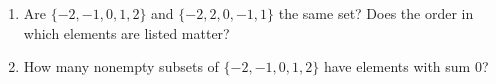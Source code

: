 \begin{enumerate}
\item[(a)] Are $\{-2,-1,0,1,2\}$ and $\{-2,2,0,-1,1\}$ the same set? Does the order in which elements are listed matter?
\item[(b)] How many nonempty subsets of $\{-2,-1,0,1,2\}$ have elements with sum $0$?
\end{enumerate}
